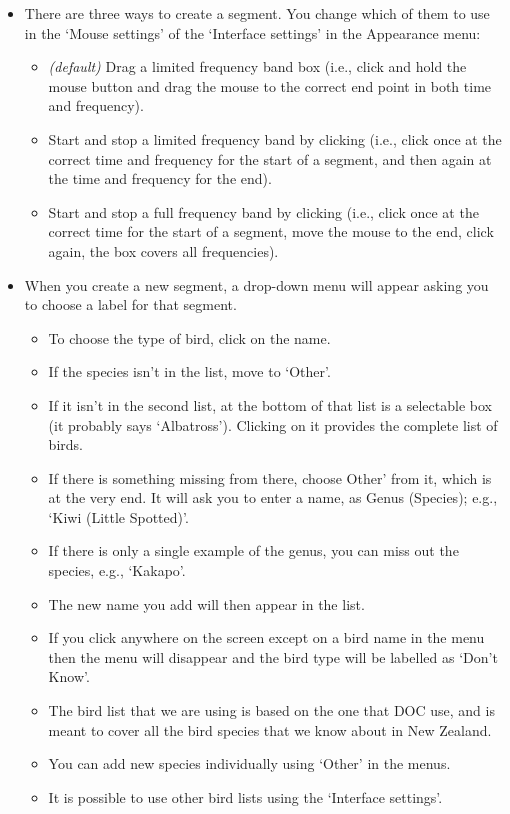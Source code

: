 \documentclass{article}
\begin{document}
\begin{itemize}
\item There are three ways to create a segment. You change which of them to use in the `Mouse settings' of the `Interface settings' in the Appearance menu:
	\begin{itemize}
	\item {\em (default)} Drag a limited frequency band box (i.e., click and hold the mouse button and drag the mouse to the correct end point in both time and frequency).
	\item Start and stop a limited frequency band by clicking (i.e., click once at the correct time and frequency for the start of a segment, and then again at the time and frequency for the end).
	\item Start and stop a full frequency band by clicking (i.e., click once at the correct time for the start of a segment, move the mouse to the end, click again, the box covers all frequencies).
	\end{itemize}
	
\item When you create a new segment, a drop-down menu will appear asking you to choose a label for that segment. 

\begin{itemize}
\item To choose the type of bird, click on the name. 
\item If the species isn't in the list, move to `Other'. 
\item If it isn't in the second list, at the bottom of that list is a selectable box (it probably says `Albatross'). Clicking on it provides the complete list of birds. 
\item If there is something missing from there, choose Other' from it, which is at the very end. It will ask you to enter a name, as Genus (Species); e.g., `Kiwi (Little Spotted)'. 
\item If there is only a single example of the genus, you can miss out the species, e.g., `Kakapo'. 
\item The new name you add will then appear in the list. 
\item If you click anywhere on the screen except on a bird name in the menu then the menu will disappear and the bird type will be labelled as `Don't Know'. 
\item The bird list that we are using is based on the one that DOC use, and is meant to cover all the bird species that we know about in New Zealand. 
\item You can add new species individually using `Other' in the menus.
\item It is possible to use other bird lists using the `Interface settings'.  
\end{itemize}


\end{itemize}
\end{document}
